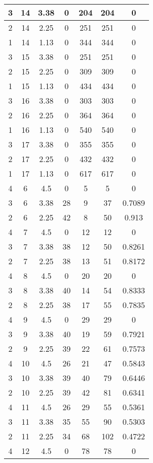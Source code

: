 \documentclass[letterpaper, 12pt]{article}
\begin{document}
\begin{longtable}{|c|c|c|c|c|c|c|}
\hline
3 & 14 & 3.38 & 0 & 204 & 204 & 0 \\
\hline
2 & 14 & 2.25 & 0 & 251 & 251 & 0 \\
\hline
1 & 14 & 1.13 & 0 & 344 & 344 & 0 \\
\hline
3 & 15 & 3.38 & 0 & 251 & 251 & 0 \\
\hline
2 & 15 & 2.25 & 0 & 309 & 309 & 0 \\
\hline
1 & 15 & 1.13 & 0 & 434 & 434 & 0 \\
\hline
3 & 16 & 3.38 & 0 & 303 & 303 & 0 \\
\hline
2 & 16 & 2.25 & 0 & 364 & 364 & 0 \\
\hline
1 & 16 & 1.13 & 0 & 540 & 540 & 0 \\
\hline
3 & 17 & 3.38 & 0 & 355 & 355 & 0 \\
\hline
2 & 17 & 2.25 & 0 & 432 & 432 & 0 \\
\hline
1 & 17 & 1.13 & 0 & 617 & 617 & 0 \\
\hline
4 & 6 & 4.5 & 0 & 5 & 5 & 0 \\
\hline
3 & 6 & 3.38 & 28 & 9 & 37 & 0.7089 \\
\hline
2 & 6 & 2.25 & 42 & 8 & 50 & 0.913 \\
\hline
4 & 7 & 4.5 & 0 & 12 & 12 & 0 \\
\hline
3 & 7 & 3.38 & 38 & 12 & 50 & 0.8261 \\
\hline
2 & 7 & 2.25 & 38 & 13 & 51 & 0.8172 \\
\hline
4 & 8 & 4.5 & 0 & 20 & 20 & 0 \\
\hline
3 & 8 & 3.38 & 40 & 14 & 54 & 0.8333 \\
\hline
2 & 8 & 2.25 & 38 & 17 & 55 & 0.7835 \\
\hline
4 & 9 & 4.5 & 0 & 29 & 29 & 0 \\
\hline
3 & 9 & 3.38 & 40 & 19 & 59 & 0.7921 \\
\hline
2 & 9 & 2.25 & 39 & 22 & 61 & 0.7573 \\
\hline
4 & 10 & 4.5 & 26 & 21 & 47 & 0.5843 \\
\hline
3 & 10 & 3.38 & 39 & 40 & 79 & 0.6446 \\
\hline
2 & 10 & 2.25 & 39 & 42 & 81 & 0.6341 \\
\hline
4 & 11 & 4.5 & 26 & 29 & 55 & 0.5361 \\
\hline
3 & 11 & 3.38 & 35 & 55 & 90 & 0.5303 \\
\hline
2 & 11 & 2.25 & 34 & 68 & 102 & 0.4722 \\
\hline
4 & 12 & 4.5 & 0 & 78 & 78 & 0 \\

\end{longtable}
\end{document}
